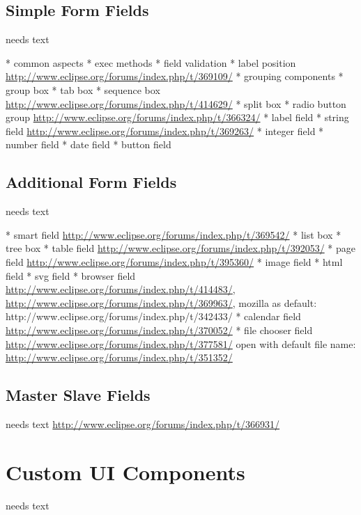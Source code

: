 \documentclass[a4paper,10pt,twoside]{book}
\begin{document}
\section{Simple Form Fields}
needs text

    * common aspects
	  * exec methods
	  * field validation
	  * label position \url{http://www.eclipse.org/forums/index.php/t/369109/}
	* grouping components
	  * group box
	  * tab box
	  * sequence box \url{http://www.eclipse.org/forums/index.php/t/414629/}
	  * split box
      * radio button group \url{http://www.eclipse.org/forums/index.php/t/366324/}
	* label field
	* string field \url{http://www.eclipse.org/forums/index.php/t/369263/}
	* integer field
	* number field
	* date field
	* button field

\section{Additional Form Fields}
needs text

	* smart field \url{http://www.eclipse.org/forums/index.php/t/369542/}
	* list box
	* tree box
	* table field \url{http://www.eclipse.org/forums/index.php/t/392053/}
	* page field \url{http://www.eclipse.org/forums/index.php/t/395360/}
	* image field	
	* html field
	* svg field
	* browser field \url{http://www.eclipse.org/forums/index.php/t/414483/}, 
	\url{http://www.eclipse.org/forums/index.php/t/369963/}, mozilla as default: http://www.eclipse.org/forums/index.php/t/342433/
	* calendar field \url{http://www.eclipse.org/forums/index.php/t/370052/}
	* file chooser field \url{http://www.eclipse.org/forums/index.php/t/377581/}
	  open with default file name: \url{http://www.eclipse.org/forums/index.php/t/351352/}
  
\section{Master Slave Fields}
needs text
\url{http://www.eclipse.org/forums/index.php/t/366931/}

\chapter{Custom UI Components}
needs text
\end{document}
